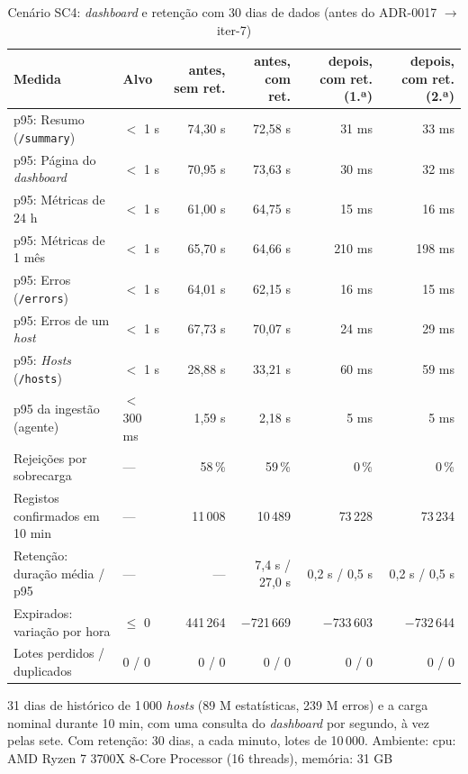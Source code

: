 \begin{table}[htbp]
  \centering\small
  \caption{Cenário SC4: \emph{dashboard} e retenção com 30 dias de dados (antes do ADR-0017 $\rightarrow$ iter-7)}
  \label{tab:carga-sc4}
  \begin{tabularx}{\linewidth}{>{\raggedright\arraybackslash}Xlrrrr}
    \toprule
    Medida & Alvo & antes, sem ret. & antes, com ret. & depois, com ret. (1.ª) & depois, com ret. (2.ª) \\
    \midrule
    p95: Resumo (\texttt{/summary}) & $<$ 1 s & 74,30 s & 72,58 s & 31 ms & 33 ms \\
    p95: Página do \emph{dashboard} & $<$ 1 s & 70,95 s & 73,63 s & 30 ms & 32 ms \\
    p95: Métricas de 24 h & $<$ 1 s & 61,00 s & 64,75 s & 15 ms & 16 ms \\
    p95: Métricas de 1 mês & $<$ 1 s & 65,70 s & 64,66 s & 210 ms & 198 ms \\
    p95: Erros (\texttt{/errors}) & $<$ 1 s & 64,01 s & 62,15 s & 16 ms & 15 ms \\
    p95: Erros de um \emph{host} & $<$ 1 s & 67,73 s & 70,07 s & 24 ms & 29 ms \\
    p95: \emph{Hosts} (\texttt{/hosts}) & $<$ 1 s & 28,88 s & 33,21 s & 60 ms & 59 ms \\
    p95 da ingestão (agente) & $<$ 300 ms & 1,59 s & 2,18 s & 5 ms & 5 ms \\
    Rejeições por sobrecarga & --- & 58\,\% & 59\,\% & 0\,\% & 0\,\% \\
    Registos confirmados em 10 min & --- & 11\,008 & 10\,489 & 73\,228 & 73\,234 \\
    Retenção: duração média / p95 & --- & --- & 7,4 s / 27,0 s & 0,2 s / 0,5 s & 0,2 s / 0,5 s \\
    Expirados: variação por hora & $\le$ 0 & 441\,264 & $-$721\,669 & $-$733\,603 & $-$732\,644 \\
    Lotes perdidos / duplicados & 0 / 0 & 0 / 0 & 0 / 0 & 0 / 0 & 0 / 0 \\
    \bottomrule
  \end{tabularx}
  \par\smallskip\footnotesize 31 dias de histórico de 1\,000 \emph{hosts} (89 M estatísticas, 239 M erros) e a carga nominal durante 10 min, com uma consulta do \emph{dashboard} por segundo, à vez pelas sete. Com retenção: 30 dias, a cada minuto, lotes de 10\,000. Ambiente: cpu: AMD Ryzen 7 3700X 8-Core Processor (16 threads), memória: 31 GB
\end{table}
